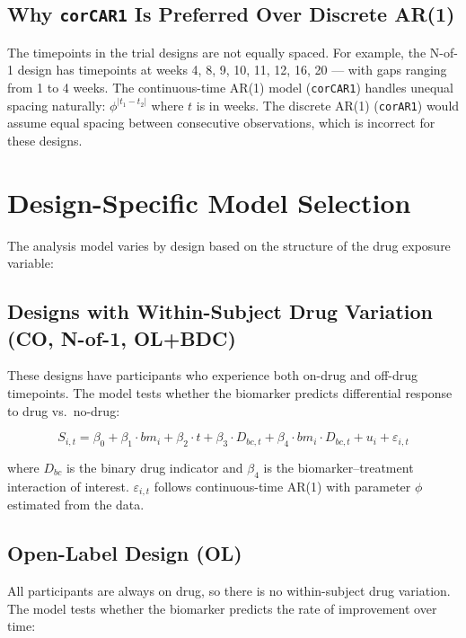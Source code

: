 \documentclass[11pt]{article}
\begin{document}
\subsection{Why \texttt{corCAR1} Is Preferred Over Discrete
            AR(1)}

The timepoints in the trial designs are not equally spaced.
For example, the N-of-1 design has timepoints at weeks
4, 8, 9, 10, 11, 12, 16, 20 --- with gaps ranging from
1 to 4 weeks. The continuous-time AR(1) model
(\texttt{corCAR1}) handles unequal spacing naturally:
$\phi^{|t_1 - t_2|}$ where $t$ is in weeks. The discrete
AR(1) (\texttt{corAR1}) would assume equal spacing between
consecutive observations, which is incorrect for these
designs.

\section{Design-Specific Model Selection}

The analysis model varies by design based on the structure
of the drug exposure variable:

\subsection{Designs with Within-Subject Drug Variation
            (CO, N-of-1, OL+BDC)}

These designs have participants who experience both on-drug
and off-drug timepoints. The model tests whether the
biomarker predicts differential response to drug vs.\
no-drug:

\begin{equation}
S_{i,t} = \beta_0 + \beta_1 \cdot bm_i + \beta_2 \cdot t +
\beta_3 \cdot D_{bc,t} +
\beta_4 \cdot bm_i \cdot D_{bc,t} + u_i +
\varepsilon_{i,t}
\label{eq:varInDb}
\end{equation}

where $D_{bc}$ is the binary drug indicator and $\beta_4$ is
the biomarker--treatment interaction of interest.
$\varepsilon_{i,t}$ follows continuous-time AR(1) with
parameter $\phi$ estimated from the data.

\subsection{Open-Label Design (OL)}

All participants are always on drug, so there is no
within-subject drug variation. The model tests whether the
biomarker predicts the rate of improvement over time:
\end{document}
